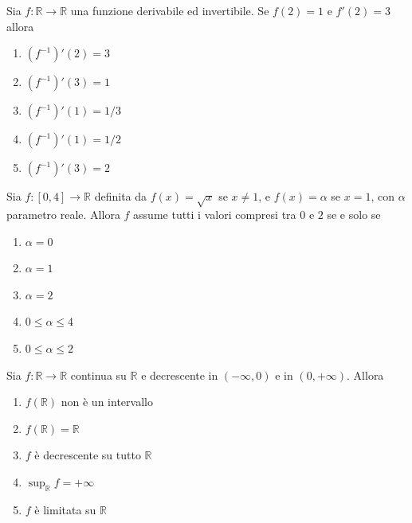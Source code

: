 \begin{quiz}
Sia $f:\mathbb R\to\mathbb R$ una funzione derivabile ed invertibile. Se $f(2)=1$ e $f'(2)=3$ allora
\begin{enumerate}
\item $(f^{-1})'(2)=3$
\item $(f^{-1})'(3)=1$
\item $(f^{-1})'(1)=1/3$
\item $(f^{-1})'(1)=1/2$
\item $(f^{-1})'(3)=2$
\end{enumerate}
\end{quiz}

\begin{quiz}
Sia $f:[0,4]\to\mathbb R$ definita da $f(x)=\sqrt{x}$ se $x\ne1$, e $f(x)=\alpha$ se $x=1$, con $\alpha$ parametro reale. Allora $f$ assume tutti i valori compresi tra $0$ e $2$ se e solo se
\begin{enumerate}
\item $\alpha=0$
\item $\alpha=1$
\item $\alpha=2$
\item $0\le\alpha\le4$
\item $0\le\alpha\le2$
\end{enumerate}
\end{quiz}

\begin{quiz}
Sia $f:\mathbb R\to\mathbb R$ continua su $\mathbb R$ e decrescente in $(-\infty,0)$ e in $(0,+\infty)$. Allora
\begin{enumerate}
\item $f(\mathbb R)$ non \`e un intervallo
\item $f(\mathbb R)=\mathbb R$
\item $f$ \`e decrescente su tutto $\mathbb R$
\item $\sup_{\mathbb R}f=+\infty$
\item $f$ \`e limitata su $\mathbb R$
\end{enumerate}
\end{quiz}

